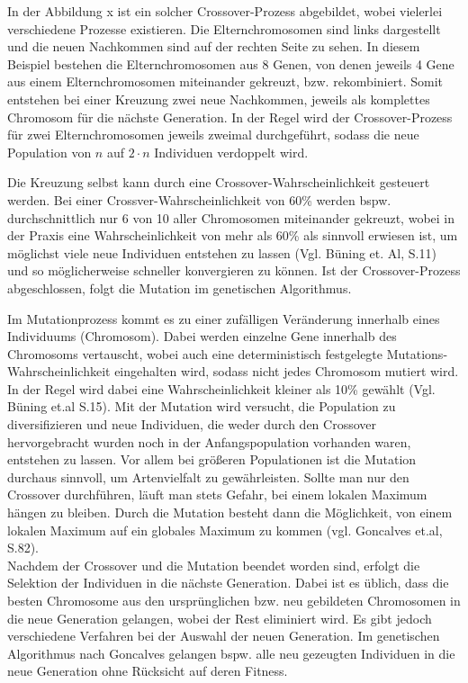 \documentclass[a4paper,12pt,parskip,bibtotoc,liststotoc]{article}
\begin{document}
In der Abbildung x ist ein solcher Crossover-Prozess abgebildet, wobei vielerlei verschiedene Prozesse existieren. 
Die Elternchromosomen sind links dargestellt und die neuen Nachkommen sind auf der rechten Seite zu sehen. 
In diesem Beispiel bestehen die Elternchromosomen aus 8 Genen, von denen jeweils 4 Gene aus einem Elternchromosomen miteinander gekreuzt, bzw. rekombiniert. 
Somit entstehen bei einer Kreuzung zwei neue Nachkommen, jeweils als komplettes Chromosom für die nächste Generation. 
In der Regel wird der Crossover-Prozess für zwei Elternchromosomen jeweils zweimal durchgeführt, sodass die neue Population von $n$ auf $2\cdot n$ Individuen verdoppelt wird.

Die Kreuzung selbst kann durch eine Crossover-Wahrscheinlichkeit gesteuert werden. 
Bei einer Crossver-Wahrscheinlichkeit von 60\% werden bspw. durchschnittlich nur 6 von 10 aller Chromosomen miteinander gekreuzt, wobei in der Praxis eine Wahrscheinlichkeit von mehr als 60\% als sinnvoll erwiesen ist, um möglichst viele neue Individuen entstehen zu lassen (Vgl. Büning et. Al, S.11) und so möglicherweise schneller konvergieren zu können.
Ist der Crossover-Prozess abgeschlossen, folgt die Mutation im genetischen Algorithmus.

Im Mutationprozess kommt es zu einer zufälligen Veränderung innerhalb eines Individuums (Chromosom). 
Dabei werden einzelne Gene innerhalb des Chromosoms vertauscht, wobei auch eine deterministisch festgelegte Mutations-Wahrscheinlichkeit eingehalten wird, sodass nicht jedes Chromosom mutiert wird. 
In der Regel wird dabei eine Wahrscheinlichkeit kleiner als 10\% gewählt (Vgl. Büning et.al S.15).
Mit der Mutation wird versucht, die Population zu diversifizieren und neue Individuen, die weder durch den Crossover hervorgebracht wurden noch in der Anfangspopulation vorhanden waren, entstehen zu lassen. Vor allem bei größeren Populationen ist die Mutation durchaus sinnvoll, um Artenvielfalt zu gewährleisten. Sollte man nur den Crossover durchführen, läuft man stets Gefahr, bei einem lokalen Maximum hängen zu bleiben. Durch die Mutation besteht dann die Möglichkeit, von einem lokalen Maximum auf ein globales Maximum zu kommen (vgl. Goncalves et.al, S.82).\\

Nachdem der Crossover und die Mutation beendet worden sind, erfolgt die Selektion der Individuen in die nächste Generation. 
Dabei ist es üblich, dass die besten Chromosome aus den ursprünglichen bzw. neu gebildeten Chromosomen in die neue Generation gelangen, wobei der Rest eliminiert wird. 
Es gibt jedoch verschiedene Verfahren bei der Auswahl der neuen Generation.
Im genetischen Algorithmus nach Goncalves gelangen bspw. alle neu gezeugten Individuen in die neue Generation ohne Rücksicht auf deren Fitness.
\end{document}
